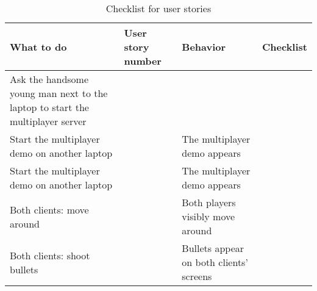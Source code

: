 \documentclass{article}
\begin{document}
\begin{table}[H]
    \centering
    \begin{tabular}{|p{3cm}|p{3cm}|p{6cm}|p{3cm}|}
    \hline
    \textbf{What to do} & \textbf{User story number} & \textbf{Behavior} & \textbf{Checklist} \\ \hline
    Ask the handsome young man next to the laptop to start the multiplayer server & & & \\ \hline
    Start the multiplayer demo on another laptop & & The multiplayer demo appears & \\ \hline
    Start the multiplayer demo on another laptop & & The multiplayer demo appears & \\ \hline
    Both clients: move around & & Both players visibly move around & \\ \hline
    Both clients: shoot bullets & & Bullets appear on both clients' screens & \\ \hline
    
    \end{tabular}
    \caption{Checklist for user stories}
    \label{tab:user_stories}
    \end{table}
\end{document}
